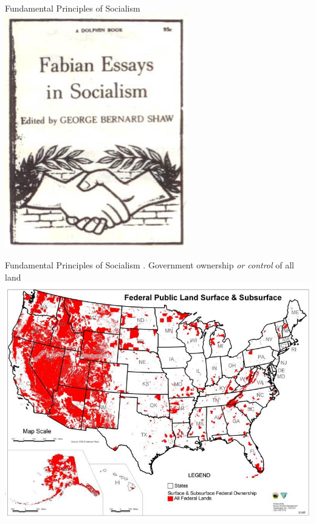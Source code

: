 \begin{frame}{Fundamental Principles of Socialism}
    \centering
    \includegraphics[height=.9\textheight]{img/fabian.png} \\
\end{frame}

\begin{frame}[t]{Fundamental Principles of Socialism}
    . Government ownership \emph{or control} of all land \\
    \includegraphics[height=.9\textheight]{img/federal-lands.png} \\
\end{frame}

